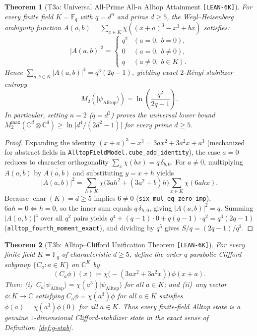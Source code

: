 \documentclass[11pt,letterpaper]{article}
\theoremstyle{plain}
\newtheorem{theorem}{Theorem}[section]
\theoremstyle{definition}
\theoremstyle{remark}
\newcommand{\F}{\mathbb{F}}
\newcommand{\C}{\mathbb{C}}
\newcommand{\ket}[1]{\lvert #1 \rangle}
\newcommand{\leanref}[1]{\textnormal{\texttt{\footnotesize #1}}}
\newcommand{\tagbadge}[1]{\textnormal{\texttt{\small [#1]}}}
\begin{document}
\begin{theorem}[{T3a: Universal All-Prime All-$n$ Alltop Attainment \tagbadge{LEAN-6K}}]
\label{thm:t3a}
For every finite field $K=\F_q$ with $q=d^n$ and prime $d\ge 5$, the Weyl--Heisenberg ambiguity function $A(a,b)=\sum_{x\in K}\chi((x+a)^3-x^3+bx)$ satisfies:
\begin{equation}
\label{eq:alltop-amb}
  |A(a,b)|^2 =
  \begin{cases}
    q^2 & (a=0,\; b=0),\\
    0   & (a=0,\; b\neq 0),\\
    q   & (a\neq 0,\; b\in K).
  \end{cases}
\end{equation}
Hence $\sum_{a,b\in K}|A(a,b)|^4 = q^3(2q-1)$, yielding exact $2$-R\'enyi stabilizer entropy
\[
  M_2(\ket{\psi_{\mathrm{Alltop}}}) = \ln\!\left(\frac{q^2}{2q-1}\right).
\]
In particular, setting $n=2$ ($q=d^2$) proves the universal lower bound $M_2^{\max}(\C^d\otimes\C^d)\ge \ln\!\bigl[d^4/(2d^2-1)\bigr]$ for \emph{every} prime $d\ge 5$.
\end{theorem}

\begin{proof}
Expanding the identity $(x+a)^3-x^3=3ax^2+3a^2x+a^3$ (mechanized for abstract fields in \leanref{AlltopFieldModel.\allowbreak cube\_\allowbreak add\_\allowbreak identity}), the case $a=0$ reduces to character orthogonality $\sum_x \chi(bx)=q\,\delta_{b,0}$. For $a\neq 0$, multiplying $A(a,b)$ by $\overline{A(a,b)}$ and substituting $y=x+h$ yields
\[
  |A(a,b)|^2 = \sum_{h\in K}\chi\bigl(3ah^2+(3a^2+b)h\bigr)\sum_{x\in K}\chi(6ahx).
\]
Because $\operatorname{char}(K)=d\ge 5$ implies $6\neq 0$ (\leanref{six\_\allowbreak mul\_\allowbreak eq\_\allowbreak zero\_\allowbreak imp}), $6ah=0\iff h=0$, so the inner sum equals $q\,\delta_{h,0}$, giving $|A(a,b)|^2=q$. Summing $|A(a,b)|^4$ over all $q^2$ pairs yields $q^4+(q-1)\cdot 0+q(q-1)\cdot q^2=q^3(2q-1)$ (\leanref{alltop\_\allowbreak fourth\_\allowbreak moment\_\allowbreak exact}), and dividing by $q^5$ gives $S/q=(2q-1)/q^2$.
\end{proof}

\begin{theorem}[{T3b: Alltop--Clifford Unification Theorem \tagbadge{LEAN-6K}}]
\label{thm:t3b}
For every finite field $K=\F_q$ of characteristic $d\ge 5$, define the order-$q$ parabolic Clifford subgroup $\{C_a : a\in K\}$ on $\C^K$ by
\[
  (C_a\phi)(x) \coloneqq \chi\bigl(-(3ax^2 + 3a^2x)\bigr)\,\phi(x+a).
\]
Then: (i)~$C_a\ket{\psi_{\mathrm{Alltop}}}=\chi(a^3)\ket{\psi_{\mathrm{Alltop}}}$ for all $a\in K$; and (ii)~any vector $\phi:K\to\C$ satisfying $C_a\phi=\chi(a^3)\phi$ for all $a\in K$ satisfies $\phi(a)=\chi(a^3)\phi(0)$ for all $a\in K$. Thus every finite-field Alltop state is a genuine $1$-dimensional Clifford-stabilizer state in the exact sense of Definition~\ref{def:g-stab}.
\end{theorem}
\end{document}
